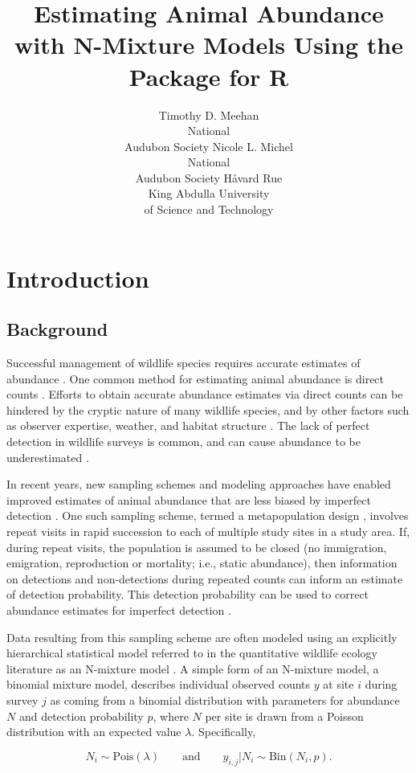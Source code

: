 \documentclass[codesnippet]{jss}
\author{Timothy D. Meehan\\National\\Audubon Society \And
	Nicole L. Michel\\National\\Audubon Society \And
	H{\aa}vard Rue\\King Abdulla University\\of Science and Technology}
\title{Estimating Animal Abundance with N-Mixture Models Using the \pkg{R-INLA} Package for R}
\begin{document}
	
\section[Introduction]{Introduction}
\subsection[Background]{Background}
Successful management of wildlife species requires accurate estimates of abundance \citep{Yoccoz_Nichols_Boulinier_2001}. One common method for estimating animal abundance is direct counts \citep{Pollock_Nichols_Simons_Farnsworth_Bailey_Sauer_2002}. Efforts to obtain accurate abundance estimates via direct counts can be hindered by the cryptic nature of many wildlife species, and by other factors such as observer expertise, weather, and habitat structure \citep{Denes_Silveira_Beissinger_2015}. The lack of perfect detection in wildlife surveys is common, and can cause abundance to be underestimated \citep{Wenger_Freeman_2008, Joseph_Elkin_Martin_Possingham_2009}.

In recent years, new sampling schemes and modeling approaches have enabled improved estimates of animal abundance that are less biased by imperfect detection \citep{Denes_Silveira_Beissinger_2015}. One such sampling scheme, termed a metapopulation design \citep{Kery_Royle_2010}, involves repeat visits in rapid succession to each of multiple study sites in a study area. If, during repeat visits, the population is assumed to be closed (no immigration, emigration, reproduction or mortality; i.e., static abundance), then information on detections and non-detections during repeated counts can inform an estimate of detection probability. This detection probability can be used to correct abundance estimates for imperfect detection \citep{Royle_2004}.

Data resulting from this sampling scheme are often modeled using an explicitly hierarchical statistical model referred to in the quantitative wildlife ecology literature as an N-mixture model \citep{Royle_Nichols_2003, Dodd_Dorazio_2004, Royle_2004, Kery_Royle_Schmid_2005}. A simple form of an N-mixture model, a binomial mixture model, describes individual observed counts $y$ at site $i$ during survey $j$ as coming from a binomial distribution with parameters for abundance $N$ and detection probability $p$, where $N$ per site is drawn from a Poisson distribution with an expected value $\lambda$. Specifically,

$$N_i \sim \text{Pois}(\lambda) \qquad \text{and} \qquad  y_{i,j} | N_i \sim \text{Bin}(N_i, p).$$
\end{document}
